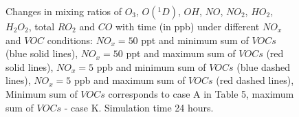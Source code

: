 \begin{figure}[h!]
\caption{Changes in mixing ratios of $O_3$, $O(^1D)$, $OH$, $NO$, $NO_2$, $HO_2$, $H_2O_2$, total $RO_2$ and $CO$ with time (in ppb) under different $NO_x$ and $VOC$ conditions: 
$NO_x=50$ ppt and minimum sum of $VOCs$ (blue solid lines), 
$NO_x=50$ ppt and maximum sum of $VOCs$ (red solid lines), 
$NO_x=5$ ppb and minimum sum of $VOCs$ (blue dashed lines),
$NO_x=5$ ppb and maximum sum of $VOCs$ (red dashed lines), Minimum sum of $VOCs$ corresponds to case A in Table 5, maximum sum of $VOCs$ - case K. Simulation time 24 hours.}
\label{fig:model_validation}
\end{figure}
